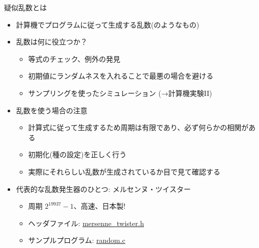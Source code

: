 \begin{frame}[t,fragile]{疑似乱数とは}
  \begin{itemize}
  \item 計算機でプログラムに従って生成する乱数(のようなもの)
  \item 乱数は何に役立つか？
    \begin{itemize}
    \item 等式のチェック、例外の発見
    \item 初期値にランダムネスを入れることで最悪の場合を避ける
    \item サンプリングを使ったシミュレーション (→計算機実験II)
    \end{itemize}
  \item 乱数を使う場合の注意
    \begin{itemize}
    \item 計算式に従って生成するため周期は有限であり、必ず何らかの相関がある
    \item 初期化(種の設定)を正しく行う
    \item 実際にそれらしい乱数が生成されているか目で見て確認する
    \end{itemize}
  \item 代表的な乱数発生器のひとつ: メルセンヌ・ツイスター
    \begin{itemize}
    \item 周期 $2^{19937}-1$、高速、日本製!
    \item ヘッダファイル: \href{https://github.com/todo-group/computer-experiments/blob/master/exercise/include/mersenne_twister.h}{mersenne\_twister.h}
    \item サンプルプログラム: \href{https://github.com/todo-group/computer-experiments/blob/master/exercise/monte_carlo/random.c}{random.c}
    \end{itemize}
  \end{itemize}
\end{frame}
